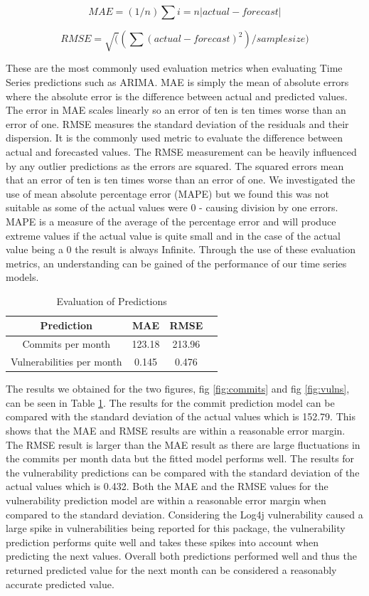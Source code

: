 \documentclass[conference]{IEEEtran}
\begin{document}
\[ MAE = (1/n) \sum{i=n} |actual - forecast| \]

\[ RMSE = \sqrt( (\sum (actual - forecast) ^ 2) / sample size )  \]

These are the most commonly used evaluation metrics when evaluating Time Series predictions such as ARIMA. MAE is simply the mean of absolute errors where the absolute error is the difference between actual and predicted values. The error in MAE scales linearly so an error of ten is ten times worse than an error of one. RMSE measures the standard deviation of the residuals and their dispersion. It is the commonly used metric to evaluate the difference between actual and forecasted values. The RMSE measurement can be heavily influenced by any outlier predictions \cite{f_abdulhafidh_dael_performance_2022} as the errors are squared. The squared errors mean that an error of ten is ten times worse than an error of one. We investigated the use of mean absolute percentage error (MAPE) but we found this was not suitable as some of the actual values were 0 - causing division by one errors. MAPE is a measure of the average of the percentage error and will produce extreme values if the actual value is quite small and in the case of the actual value being a 0 the result is always Infinite. Through the use of these evaluation metrics, an understanding can be gained of the performance of our time series models. 

\begin{table}
 \caption{Evaluation of Predictions}
\label{evaluations}
\begin{center}
\begin{tabular}{|c|c|c|c|}
\hline
    \textbf{Prediction} & \textbf{MAE} & \textbf{RMSE} \\ \hline
    Commits per month & 123.18 & 213.96 \\ \hline
    Vulnerabilities per month & 0.145 & 0.476 \\ \hline
\end{tabular}
\end{center}
\end{table}

The results we obtained for the two figures, fig \ref{fig:commits} and fig \ref{fig:vulns}, can be seen in Table \ref{evaluations}. The results for the commit prediction model can be compared with the standard deviation of the actual values which is 152.79. This shows that the MAE and RMSE results are within a reasonable error margin. The RMSE result is larger than the MAE result as there are large fluctuations in the commits per month data but the fitted model performs well. The results for the vulnerability predictions can be compared with the standard deviation of the actual values which is 0.432. Both the MAE and the RMSE values for the vulnerability prediction model are within a reasonable error margin when compared to the standard deviation. Considering the Log4j vulnerability caused a large spike in vulnerabilities being reported for this package, the vulnerability prediction performs quite well and takes these spikes into account when predicting the next values. Overall both predictions performed well and thus the returned predicted value for the next month can be considered a reasonably accurate predicted value.
\end{document}
